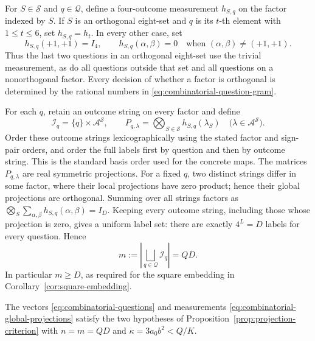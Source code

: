 For \(S\in\mathcal S\) and \(q\in\mathcal Q\), define a four-outcome
measurement \(h_{S,q}\) on the factor indexed by \(S\).  If \(S\)
is an orthogonal eight-set and \(q\) is its \(t\)-th element with
\(1\leq t\leq6\), set \(h_{S,q}=h_t\).  In every other case, set
\begin{equation}\label{eq:combinatorial-trivial-measurement}
 h_{S,q}(+1,+1)=I_4,\qquad
 h_{S,q}(\alpha,\beta)=0
 \quad\text{when }(\alpha,\beta)\ne(+1,+1).
\end{equation}
Thus the last two questions in an orthogonal eight-set use the
trivial measurement, as do all questions outside that set and all
questions on a nonorthogonal factor.  Every decision of whether a
factor is orthogonal is determined by the rational numbers in
\eqref{eq:combinatorial-question-gram}.

For each \(q\), retain an outcome string on every factor and define
\begin{equation}\label{eq:combinatorial-global-projections}
 \mathcal I_q=\{q\}\times\mathcal A^{\mathcal S},\qquad
 P_{q,\lambda}
   =\bigotimes_{S\in\mathcal S}h_{S,q}(\lambda_S)
   \quad\bigl(\lambda\in\mathcal A^{\mathcal S}\bigr).
\end{equation}
Order these outcome strings lexicographically using the stated factor and
sign-pair orders, and order the full labels first by question and then by
outcome string.  This is the standard basis order used for the concrete maps.
The matrices \(P_{q,\lambda}\) are real symmetric projections.  For a fixed \(q\), two
distinct strings differ in some factor, where their local projections
have zero product; hence their global projections are orthogonal.
Summing over all strings factors as
\(\bigotimes_S\sum_{\alpha,\beta}h_{S,q}(\alpha,\beta)=I_D\).
Keeping every outcome string, including those whose projection is zero,
gives a uniform label set: there are exactly \(4^L=D\) labels for every
question.  Hence
\begin{equation}\label{eq:combinatorial-label-count}
 m:=\left|\bigsqcup_{q\in\mathcal Q}\mathcal I_q\right|=QD.
\end{equation}
In particular \(m\geq D\), as required for the square embedding in
Corollary~\ref{cor:square-embedding}.

\begin{lemma}\label{lem:combinatorial-measurements}
The vectors \eqref{eq:combinatorial-questions} and measurements
\eqref{eq:combinatorial-global-projections} satisfy the two hypotheses
of Proposition~\ref{prop:projection-criterion} with
\(n=m=QD\) and \(\kappa=3a_0b^2<Q/K\).
\end{lemma}

